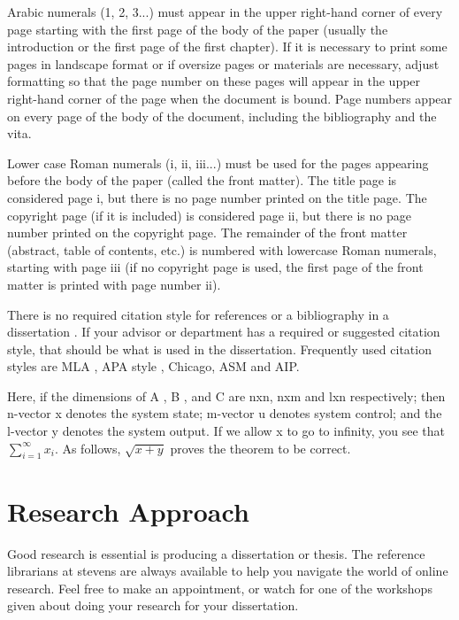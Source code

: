 Arabic numerals (1, 2, 3...) must appear in the upper right-hand corner of every page starting with the first page of the body of the paper (usually the introduction or the first page of the first chapter). If it is necessary to print some pages in landscape format or if oversize pages or materials are necessary, adjust formatting so that the page number on these pages will appear in the upper right-hand corner of the page when the document is bound. Page numbers appear on every page of the body of the document, including the bibliography and the vita.

Lower case Roman numerals (i, ii, iii...) must be used for the pages appearing before the body of the paper (called the front matter). The title page is considered page i, but there is no page number printed on the title page. The copyright page (if it is included) is considered page ii, but there is no page number printed on the copyright page. The remainder of the front matter (abstract, table of contents, etc.) is numbered with lowercase Roman numerals, starting with page iii (if no copyright page is used, the first page of the front matter is printed with page number ii). 

There is no required citation style for references or a bibliography in a dissertation \cite{rabinowitz_manual_2009}.  If your advisor or department has a required or suggested citation style, that should be what is used in the dissertation.  Frequently used citation styles are MLA \cite{gibaldi_mla}, APA style \cite{APA}, Chicago, ASM and AIP.    

Here, if the dimensions of A  , B  , and C   are nxn, nxm and lxn   respectively; then n-vector x denotes the system state; m-vector u denotes system control; and the l-vector y denotes the system output. If we allow x to go to infinity, you see that 
$\sum_{i=1}^{\infty} x_{i}$.  As follows, $\sqrt{x+y}$ proves the theorem to be correct.
 
\section{Research Approach}
Good research is essential is producing a dissertation or thesis.  The reference librarians at stevens are always available to help you navigate the world of online research.  Feel free to make an appointment, or watch for one of the workshops given about doing your research for your dissertation.  

